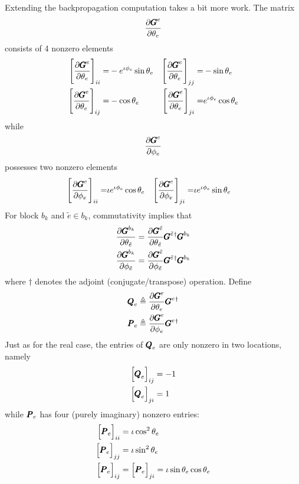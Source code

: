 \documentclass[superscriptaddress,floatfix]{article}
\begin{document}
\begin{appendices}
Extending the backpropagation computation takes a bit more work.
The matrix 
\[
  \frac{\partial{\pmb{G}}^e}{\partial\theta_e}
\]
consists of 4 nonzero elements
\begin{align}
  \Bigg[ \frac{\partial{\pmb{G}}^e}{\partial\theta_e} \Bigg]_{ii} = & -e^{\iota\phi_{e}}\sin\theta_e & \Bigg[ \frac{\partial{\pmb{G}}^e}{\partial\theta_e} \Bigg]_{jj} = & -\sin \theta_e \nonumber  \\
  \Bigg[ \frac{\partial{\pmb{G}}^e}{\partial\theta_e} \Bigg]_{ij} = & -\cos\theta_e  &   \Bigg[ \frac{\partial{\pmb{G}}^e}{\partial\theta_e} \Bigg]_{ji} = & e^{\iota\phi_{e}}\cos\theta_e
\end{align}
while 
\[
\frac{\partial{\pmb{G}}^e}{\partial\phi_e}
\]
possesses two nonzero elements
\begin{align}
  \Bigg[ \frac{\partial{\pmb{G}}^e}{\partial\phi_e} \Bigg]_{ii} = & \iota e^{\iota\phi_{e}}\cos\theta_e &   \Bigg[ \frac{\partial{\pmb{G}}^e}{\partial\phi_e} \Bigg]_{ji} = & \iota e^{\iota\phi_{e}}\sin \theta_e 
\end{align}
For block $b_k$ and $\tilde{e} \in b_k$, commutativity implies that
\begin{align}
 \frac{\partial {\pmb{G}}^{b_k}}{\partial\theta_{\tilde{e}}} = \frac{\partial{\pmb{G}}^{\tilde{e}}}{\partial\theta_{\tilde{e}}} {\pmb{G}}^{\tilde{e}}{}^\dagger {\pmb{G}}^{b_k} \nonumber \\
 \frac{\partial {\pmb{G}}^{b_k}}{\partial\phi_{\tilde{e}}} = \frac{\partial{\pmb{G}}^{\tilde{e}}}{\partial\phi_{\tilde{e}}} {\pmb{G}}^{\tilde{e}}{}^\dagger {\pmb{G}}^{b_k}
\end{align}
where $\dagger$ denotes the adjoint (conjugate/transpose) operation. Define
\begin{align}
  {\pmb{Q}}_e \triangleq \frac{\partial{\pmb{G}}^e}{\partial\theta_e} {\pmb{G}}^e{}^\dagger \nonumber \\
  {\pmb{P}}_e \triangleq \frac{\partial{\pmb{G}}^e}{\partial\phi_e} {\pmb{G}}^e{}^\dagger
\end{align}
Just as for the real case, the entries of ${\pmb{Q}}_e$ are only nonzero in two locations, namely
\begin{align}
  \Big[ {\pmb{Q}}_e\Big]_{ij} & = -1 \nonumber \\
  \Big[ {\pmb{Q}}_e\Big]_{ji} & = 1
\end{align}
while ${\pmb{P}}_e$ has four (purely imaginary) nonzero entries:
\begin{align}
  \Big[ {\pmb{P}}_e\Big]_{ii} & =  \iota \cos^2\theta_e \nonumber \\
  \Big[ {\pmb{P}}_e\Big]_{jj} & =  \iota  \sin^2\theta_e \nonumber \\
  \Big[ {\pmb{P}}_e\Big]_{ij} & =  \Big[ {\pmb{P}}_e\Big]_{ji}  = \iota   \sin\theta_e \cos\theta_e 
\end{align}


\end{appendices}
\end{document}
